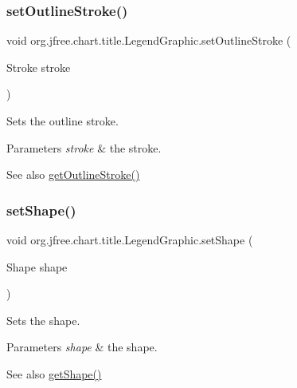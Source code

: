 \subsubsection{\texorpdfstring{set\+Outline\+Stroke()}{setOutlineStroke()}}
{\footnotesize\ttfamily void org.\+jfree.\+chart.\+title.\+Legend\+Graphic.\+set\+Outline\+Stroke (\begin{DoxyParamCaption}\item[{Stroke}]{stroke }\end{DoxyParamCaption})}

Sets the outline stroke.


\begin{DoxyParams}{Parameters}
{\em stroke} & the stroke.\\
\hline
\end{DoxyParams}
\begin{DoxySeeAlso}{See also}
\mbox{\hyperlink{classorg_1_1jfree_1_1chart_1_1title_1_1_legend_graphic_a8aaf034ed05a0cdecd32559eef6d7566}{get\+Outline\+Stroke()}} 
\end{DoxySeeAlso}
\mbox{\label{classorg_1_1jfree_1_1chart_1_1title_1_1_legend_graphic_a31d10a0f353ee943dd459932f7dcfc99}} 
\subsubsection{\texorpdfstring{set\+Shape()}{setShape()}}
{\footnotesize\ttfamily void org.\+jfree.\+chart.\+title.\+Legend\+Graphic.\+set\+Shape (\begin{DoxyParamCaption}\item[{Shape}]{shape }\end{DoxyParamCaption})}

Sets the shape.


\begin{DoxyParams}{Parameters}
{\em shape} & the shape.\\
\hline
\end{DoxyParams}
\begin{DoxySeeAlso}{See also}
\mbox{\hyperlink{classorg_1_1jfree_1_1chart_1_1title_1_1_legend_graphic_ab29b7497783a46d5ed00993aed529575}{get\+Shape()}} 
\end{DoxySeeAlso}
\mbox{\label{classorg_1_1jfree_1_1chart_1_1title_1_1_legend_graphic_a392280321e9ef4cd9863829e3d147ba8}} 
